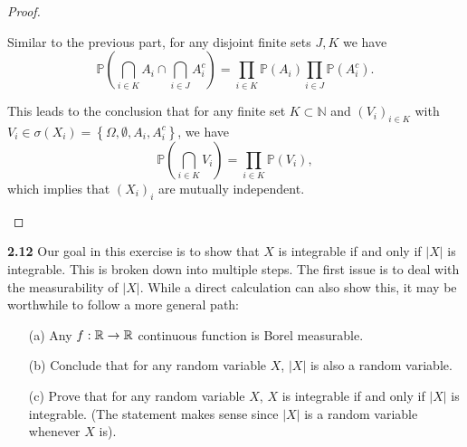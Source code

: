 \begin{proof}
\begin{enumerate}
\begin{enumerate}
        Similar to the previous part, for any disjoint finite sets $J, K$ we have
        $$\mathbb{P}\left(\bigcap_{i \in K} A_{i} \cap \bigcap_{i \in J} A_{i}^{c}\right)=\prod_{i \in K} \mathbb{P}\left(A_{i}\right) \prod_{i \in J} \mathbb{P}\left(A_{i}^{c}\right).$$

        This leads to the conclusion that for any finite set $K \subset \mathbb{N}$ and $\left(V_{i}\right)_{i \in K}$ with $V_{i} \in \sigma\left(X_{i}\right)=\left\{\Omega, \emptyset, A_{i}, A_{i}^{c}\right\}$,
        we have $$\mathbb{P}\left(\bigcap_{i \in K} V_{i}\right)=\prod_{i \in K} \mathbb{P}\left(V_{i}\right),$$
        which implies that $(X_i)_i$ are mutually independent.
    \end{enumerate}

\end{enumerate}

\end{proof}

\noindent\textbf{2.12} Our goal in this exercise is to show that $X$ is integrable if and only if $|X|$ is integrable. This is broken down into multiple steps. The first issue is to deal with the measurability of $|X|$. While a direct calculation can also show this, it may be worthwhile to follow a more general path:
\begin{enumerate}
    \item[(a)] Any $f : \mathbb{R} \to \mathbb{R}$ continuous function is Borel measurable.
    \item[(b)] Conclude that for any random variable $X$, $|X|$ is also a random variable.
    \item[(c)] Prove that for any random variable $X$, $X$ is integrable if and only if $|X|$ is integrable. (The statement makes sense since $|X|$ is a random variable whenever $X$ is).
\end{enumerate}

